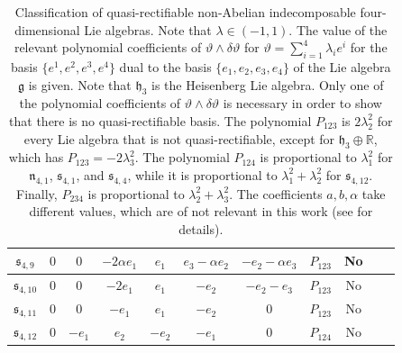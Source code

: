 \documentclass[12pt]{article}
\theoremstyle{plain}
\theoremstyle{definition}
\numberwithin{equation}{section}
\begin{document}
{\begin{table}[ht]
\begin{tabular}{|c|c|c|c|c|c|c|c|c|c|c|}
             $\mathfrak{s}_{4,9} $ & $0$ & $0$ & $-2\alpha e_1$ & $e_1$ &$e_3-\alpha e_2$&$-e_2-\alpha e_3$& $P_{123}$&No\\
                     \hline
             $\mathfrak{s}_{4,10} $ & $0$ & $0$ & $-2e_1$ & $e_1$ &$-e_2$&$-e_2-e_3$&$P_{123}$& No\\
                     \hline
             $\mathfrak{s}_{4,11} $ & $0$ & $0$ & $-e_1$ & $e_1$ &$-e_2$&$0$& $P_{123}$&No\\
                \hline
             $\mathfrak{s}_{4,12} $ & $0$ & $-e_1$ & $e_2$ & $-e_2$ &$-e_1$&$0$& $P_{124}$&No\\
        \hline
    \end{tabular}
    \caption{Classification of quasi-rectifiable non-Abelian indecomposable four-dimensional Lie algebras. Note that $\lambda\in (-1,1).$ The value of the relevant polynomial coefficients of $\vartheta\wedge \delta \vartheta$ for $\vartheta=\sum_{i=1}^4\lambda_ie^i$ for the basis $\{e^1,e^2,e^3,e^4\}$ dual to the basis $\{e_1,e_2,e_3,e_4\}$ of the Lie algebra $\mathfrak{g}$ is given. Note that $\mathfrak{h}_3$ is the Heisenberg Lie algebra. Only one of the polynomial coefficients of $\vartheta\wedge \delta\vartheta$ is necessary in order to show that there is no quasi-rectifiable basis. The polynomial $P_{123}$ is $2\lambda_2^2$ for every Lie algebra that is not quasi-rectifiable, except for $\mathfrak{h}_3\oplus \mathbb{R}$, which has $P_{123}=-2\lambda_3^2$. The polynomial $P_{124}$ is proportional to $\lambda_1^2$ for $\mathfrak{n}_{4,1}$,  $\mathfrak{s}_{4,1}$, and $\mathfrak{s}_{4,4}$, while it is proportional to $\lambda_1^2+\lambda_2^2$ for $\mathfrak{s}_{4,12}$. Finally, $P_{234}$ is proportional to $\lambda_2^2+\lambda_3^2$. The coefficients $a,b,\alpha$ take different values, which are of not relevant in this work (see \cite{WS14} for details).}
    \label{fig:Lie-algebra-classification4}
\end{table}}
\end{document}

